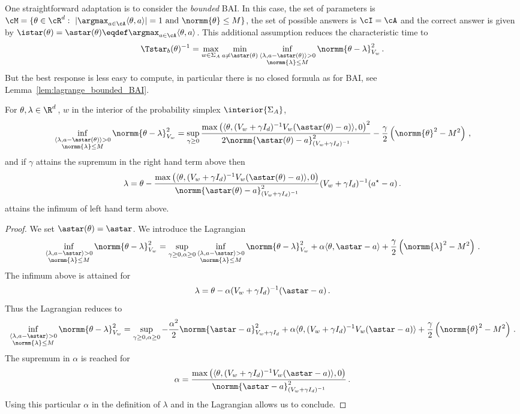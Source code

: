 One straightforward adaptation is to consider the \emph{bounded} BAI. In this case, the set of parameters is $\cM=\{\theta \in \cR^d:\ |\argmax_{a\in\cA} \langle\theta,a\rangle|=1 \text{ and } \normm{\theta}\leq M\}$, the set of possible answers is $\cI = \cA$ and the correct answer is given by $\istar(\theta)=\astar(\theta)\eqdef \argmax_{a\in\cA} \langle\theta,a\rangle$.
This additional assumption reduces the characteristic time to
\[
\Tstar_b(\theta)^{-1} = \max_{w\in\Sigma_A} \min_{a\neq \astar(\theta)} \inf_{\substack{\langle \lambda,a-\astar(\theta)\rangle>0\\ \normm{\lambda}\leq M}} \normm{\theta -\lambda }_{V_w}^2 \,.
\]
But the best response is less easy to compute, in particular there is no closed formula as for BAI, see Lemma~\ref{lem:lagrange_bounded_BAI}.
\begin{lemma}\label{lem:lagrange_bounded_BAI}
For $\theta, \lambda \in \R^d\,$, $w$ in the interior of the probability simplex $\interior{\Sigma_A}$,
\[
\inf_{\substack{\langle \lambda,a-\astar(\theta)\rangle>0\\ \normm{\lambda}\leq M}} \normm{\theta -\lambda }_{V_w}^2 = \sup_{\gamma\geq 0} \frac{\max\left(\langle \theta, (V_w+\gamma I_d)^{-1} V_w (\astar(\theta)-a)\rangle,0\right)^2 }{2\normm{\astar(\theta)-a}^2_{(V_w+\gamma I_d)^{-1}}}- \frac{\gamma}{2}\left(\normm{\theta}^2-M^2\right)\,,
\]
and if $\gamma$ attains the supremum in the right hand term above then
\[
\lambda = \theta - \frac{\max\left(\langle \theta, (V_w+\gamma I_d)^{-1} V_w (\astar(\theta)-a)\rangle,0\right)}{\normm{\astar(\theta)-a}^2_{(V_w+\gamma I_d)^{-1}}} (V_w+\gamma I_d)^{-1}(a^\star - a)\,.
\]
attains the infimum of left hand term above.
\end{lemma}
\begin{proof}
We set $\astar(\theta) = \astar$. We introduce the Lagrangian
\[
 \inf_{\substack{\langle \lambda,a-\astar \rangle>0\\ \normm{\lambda}\leq M}} \normm{\theta -\lambda }_{V_w}^2 = \sup_{\gamma\geq 0, \alpha\geq 0} \inf_{\substack{\langle \lambda,a-\astar\rangle>0\\ \normm{\lambda}\leq M}} \normm{\theta -\lambda }_{V_w}^2 +\alpha \langle \theta, \astar-a\rangle + \frac{\gamma}{2}\left(\normm{\lambda}^2-M^2 \right)\,.
\]
The infimum above is attained for
\[
\lambda = \theta - \alpha (V_w + \gamma I_d)^{-1}(\astar-a)\,.
\]
Thus the Lagrangian reduces to
\[
\inf_{\substack{\langle \lambda,a-\astar \rangle>0\\ \normm{\lambda}\leq M}} \normm{\theta -\lambda }_{V_w}^2 = \sup_{\gamma\geq 0, \alpha\geq 0}
-\frac{\alpha^2}{2} \normm{\astar-a}^2_{V_w+\gamma I_d} + \alpha \langle \theta, (V_w+\gamma I_d)^{-1}V_w (\astar-a)\rangle +\frac{\gamma}{2}\left(\normm{\theta}^2-M^2 \right)\,.
\]
The supremum in $\alpha$ is reached for
\[
\alpha =\frac{\max\left(\langle \theta, (V_w+\gamma I_d)^{-1} V_w (\astar-a)\rangle,0\right)}{\normm{\astar-a}^2_{(V_w+\gamma I_d)^{-1}}}\,.
\]
Using this particular $\alpha$ in the definition of $\lambda$ and in the Lagrangian allows us to conclude.
\end{proof}


